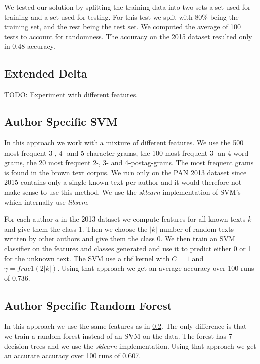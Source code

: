 We tested our solution by splitting the training data into two sets a set used
for training and a set used for testing. For this test we split with 80\% being
the training set, and the rest being the test set. We computed the average of
100 tests to account for randomness. The accuracy on the 2015 dataset resulted
only in 0.48 accuracy.

\subsection{Extended Delta}
TODO: Experiment with different features.

\subsection{Author Specific SVM} \label{subsec:author_specific_svm}
In this approach we work with a mixture of different features. We use the 500
most frequent 3-, 4- and 5-character-grams, the 100 most frequent 3- an
4-word-grams, the 20 most frequent 2-, 3- and 4-postag-grams. The most frequent
grams is found in the brown text corpus. We run only on the PAN 2013 dataset
since 2015 contains only a single known text per author and it would therefore
not make sense to use this method. We use the \textit{sklearn} implementation of
\gls{SVM}'s which internally use \textit{libsvm}.

For each author $a$ in the 2013 dataset we compute features for all known texts
$k$ and give them the class 1. Then we choose the $|k|$ number of random texts
written by other authors and give them the class 0. We then train an \gls{SVM}
classifier on the features and classes generated and use it to predict either 0
or 1 for the unknown text. The \gls{SVM} use a rbf kernel with $C=1$ and
$\gamma = frac{1}{(2|k|)}$. Using that approach we get an average accuracy over
100 runs of 0.736.

\subsection{Author Specific Random Forest}
In this approach we use the same features as in
\ref{subsec:author_specific_svm}. The only difference is that we train a random
forest instead of an \gls{SVM} on the data. The forest has 7 decision trees and
we use the \textit{sklearn} implementation. Using that approach we get an
accurate accuracy over 100 runs of 0.607.
